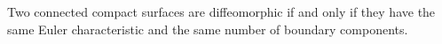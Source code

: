 Two connected compact surfaces are diffeomorphic if and only if they have the same Euler characteristic and the same number of boundary components.
